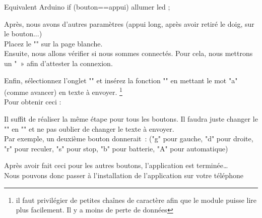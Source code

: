 \begin{Cpp}{Equivalent Arduino}
if (bouton==appui) {allumer led ;}     
\end{Cpp}
	        
Après, nous avons d'autres  paramètres (appui long, après avoir retiré le doig, sur le bouton...) \\


Placez le "" sur la page blanche. \\

Ensuite, nous allons vérifier si nous sommes connectés. Pour cela, nous mettrons un " » afin d’attester la connexion.

Enfin, sélectionnez l'onglet "" et insérez la fonction "" en mettant le mot "a" (comme avancer) en texte à envoyer. \footnote{il faut privilégier de petites chaînes de caractère afin que le module puisse lire plus facilement. Il y a moins de perte de données} \\
Pour obtenir ceci : 



Il suffit de réaliser la même étape pour tous les boutons. Il faudra juste changer le "" en "" et ne pas oublier de changer le texte à envoyer. \\


Par exemple, un deuxième bouton donnerait :  ("g" pour gauche, "d" pour droite, "r" pour reculer, "s" pour stop, "b" pour batterie, "A" pour automatique)


Après avoir fait ceci pour les autres boutons, l'application est terminée… \\
Nous pouvons donc passer à l'installation de l'application sur votre téléphone